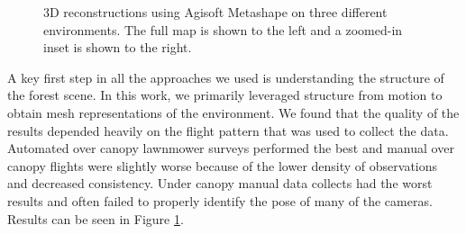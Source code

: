 \begin{figure}[h]
    \hfill
    \caption{3D reconstructions using Agisoft Metashape on three different environments. The full map is shown to the left and a zoomed-in inset is shown to the right.}
    \label{fig:results:sfm}
\end{figure}

A key first step in all the approaches we used is understanding the structure of the forest scene. In this work, we primarily leveraged structure from motion to obtain mesh representations of the environment. We found that the quality of the results depended heavily on the flight pattern that was used to collect the data. Automated over canopy lawnmower surveys performed the best and manual over canopy flights were slightly worse because of the lower density of observations and decreased consistency. Under canopy manual data collects had the worst results and often failed to properly identify the pose of many of the cameras. Results can be seen in Figure \ref{fig:results:sfm}.



